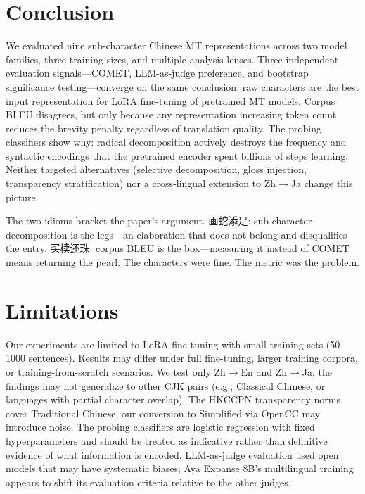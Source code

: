 \documentclass[11pt]{article}
\begin{document}
\section{Conclusion}
\label{sec:conclusion}

We evaluated nine sub-character Chinese MT representations across two model families, three training sizes, and multiple analysis lenses. Three independent evaluation signals---COMET, LLM-as-judge preference, and bootstrap significance testing---converge on the same conclusion: raw characters are the best input representation for LoRA fine-tuning of pretrained MT models. Corpus BLEU disagrees, but only because any representation increasing token count reduces the brevity penalty regardless of translation quality. The probing classifiers show why: radical decomposition actively destroys the frequency and syntactic encodings that the pretrained encoder spent billions of steps learning. Neither targeted alternatives (selective decomposition, gloss injection, transparency stratification) nor a cross-lingual extension to Zh$\to$Ja change this picture.

The two idioms bracket the paper's argument. 画蛇添足: sub-character decomposition is the legs---an elaboration that does not belong and disqualifies the entry. 买椟还珠: corpus BLEU is the box---measuring it instead of COMET means returning the pearl. The characters were fine. The metric was the problem.

\section*{Limitations}

Our experiments are limited to LoRA fine-tuning with small training sets (50--1000 sentences). Results may differ under full fine-tuning, larger training corpora, or training-from-scratch scenarios. We test only Zh$\to$En and Zh$\to$Ja; the findings may not generalize to other CJK pairs (e.g., Classical Chinese, or languages with partial character overlap). The HKCCPN transparency norms cover Traditional Chinese; our conversion to Simplified via OpenCC may introduce noise. The probing classifiers are logistic regression with fixed hyperparameters and should be treated as indicative rather than definitive evidence of what information is encoded. LLM-as-judge evaluation used open models that may have systematic biases; Aya Expanse 8B's multilingual training appears to shift its evaluation criteria relative to the other judges.
\end{document}
